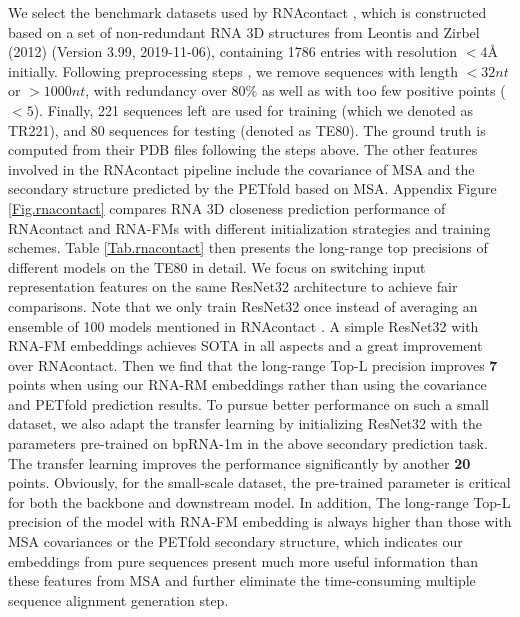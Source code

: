We select the benchmark datasets used by RNAcontact \cite{sun2021rna}, which is constructed based on a set of non-redundant RNA 3D structures from Leontis and Zirbel (2012) (Version 3.99, 2019-11-06), containing 1786 entries with resolution $<4$\r{A} initially. Following preprocessing steps \cite{sun2021rna}, we remove sequences with length $<32nt$ or $>1000nt$, with redundancy over $80\%$ as well as with too few positive points ($<5$). Finally, 221 sequences left are used for training (which we denoted as TR221), and 80 sequences for testing (denoted as TE80). The ground truth is computed from their PDB files following the steps above. The other features involved in the RNAcontact pipeline include the covariance of MSA and the secondary structure predicted by the PETfold \cite{seemann2008unifying} based on MSA.
Appendix Figure \ref{Fig.rnacontact} compares RNA 3D closeness prediction performance of RNAcontact and RNA-FMs with different initialization strategies and training schemes. Table \ref{Tab.rnacontact} then presents the long-range top precisions of different models on the TE80 in detail. We focus on switching input representation features on the same ResNet32 architecture to achieve fair comparisons. Note that we only train ResNet32 once instead of averaging an ensemble of 100 models mentioned in RNAcontact \cite{sun2021rna}. A simple ResNet32 with RNA-FM embeddings achieves SOTA in all aspects and a great improvement over RNAcontact. Then we find that the long-range Top-L precision \cite{wang2017accurate} improves \textbf{7} points when using our RNA-RM embeddings rather than using the covariance and PETfold prediction results. To pursue better performance on such a small dataset, we also adapt the transfer learning by initializing ResNet32 with the parameters pre-trained on bpRNA-1m in the above secondary prediction task. The transfer learning improves the performance significantly by another \textbf{20} points. Obviously, for the small-scale dataset, the pre-trained parameter is critical for both the backbone and downstream model. In addition, The long-range Top-L precision of the model with RNA-FM embedding is always higher than those with MSA covariances or the PETfold secondary structure, which indicates our embeddings from pure sequences present much more useful information than these features from MSA and further eliminate the time-consuming multiple sequence alignment generation step.

